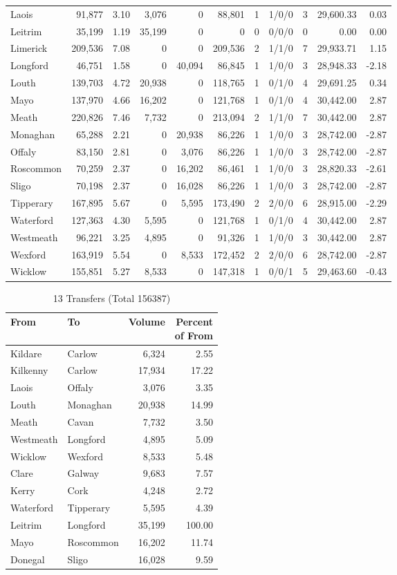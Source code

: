 \documentclass[a4paper]{article}
\begin{document}
\begin{longtable}{lrrrrrrlrrr}
Laois&91,877& 3.10&3,076&0&88,801&1&1/0/0&3&29,600.33& 0.03\\ 
Leitrim&35,199& 1.19&35,199&0&0&0&0/0/0&0& 0.00& 0.00\\ 
Limerick&209,536& 7.08&0&0&209,536&2&1/1/0&7&29,933.71& 1.15\\ 
Longford&46,751& 1.58&0&40,094&86,845&1&1/0/0&3&28,948.33&-2.18\\ 
Louth&139,703& 4.72&20,938&0&118,765&1&0/1/0&4&29,691.25& 0.34\\ 
Mayo&137,970& 4.66&16,202&0&121,768&1&0/1/0&4&30,442.00& 2.87\\ 
Meath&220,826& 7.46&7,732&0&213,094&2&1/1/0&7&30,442.00& 2.87\\ 
Monaghan&65,288& 2.21&0&20,938&86,226&1&1/0/0&3&28,742.00&-2.87\\ 
Offaly&83,150& 2.81&0&3,076&86,226&1&1/0/0&3&28,742.00&-2.87\\ 
Roscommon&70,259& 2.37&0&16,202&86,461&1&1/0/0&3&28,820.33&-2.61\\ 
Sligo&70,198& 2.37&0&16,028&86,226&1&1/0/0&3&28,742.00&-2.87\\ 
Tipperary&167,895& 5.67&0&5,595&173,490&2&2/0/0&6&28,915.00&-2.29\\ 
Waterford&127,363& 4.30&5,595&0&121,768&1&0/1/0&4&30,442.00& 2.87\\ 
Westmeath&96,221& 3.25&4,895&0&91,326&1&1/0/0&3&30,442.00& 2.87\\ 
Wexford&163,919& 5.54&0&8,533&172,452&2&2/0/0&6&28,742.00&-2.87\\ 
Wicklow&155,851& 5.27&8,533&0&147,318&1&0/0/1&5&29,463.60&-0.43\\ 
\end{longtable}

\begin{table}[htbp]
\caption{13 Transfers (Total 156387)}
\centering
\begin{tabular}{llrr} \toprule
From &To &Volume &\shortstack{Percent\\of From} \\ \midrule
Kildare&Carlow&6,324& 2.55\\ 
Kilkenny&Carlow&17,934&17.22\\ 
Laois&Offaly&3,076& 3.35\\ 
Louth&Monaghan&20,938&14.99\\ 
Meath&Cavan&7,732& 3.50\\ 
Westmeath&Longford&4,895& 5.09\\ 
Wicklow&Wexford&8,533& 5.48\\ 
Clare&Galway&9,683& 7.57\\ 
Kerry&Cork&4,248& 2.72\\ 
Waterford&Tipperary&5,595& 4.39\\ 
Leitrim&Longford&35,199&100.00\\ 
Mayo&Roscommon&16,202&11.74\\ 
Donegal&Sligo&16,028& 9.59\\ 
\bottomrule
\end{tabular}
\end{table}
\end{document}
